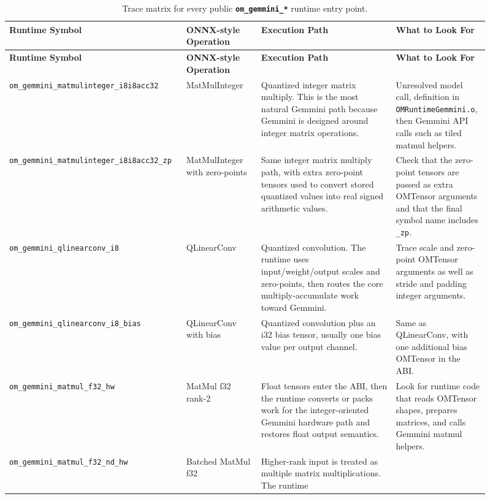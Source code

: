 \documentclass[12pt,a4paper]{article}
\newcommand{\file}[1]{\textcolor{fileteal}{\texttt{#1}}}
\newcommand{\cmd}[1]{\textcolor{argblue}{\texttt{\textbf{#1}}}}
\begin{document}
\renewcommand{\arraystretch}{1.18}
\scriptsize
\begin{longtable}{@{}p{0.32\linewidth}p{0.15\linewidth}p{0.27\linewidth}p{0.17\linewidth}@{}}
\caption{Trace matrix for every public \cmd{om\_gemmini\_*} runtime entry point.}\\
\toprule
\textbf{Runtime Symbol} & \textbf{ONNX-style Operation} & \textbf{Execution Path} & \textbf{What to Look For} \\
\midrule
\endfirsthead
\toprule
\textbf{Runtime Symbol} & \textbf{ONNX-style Operation} & \textbf{Execution Path} & \textbf{What to Look For} \\
\midrule
\endhead
\bottomrule
\endfoot
\texttt{om\_gemmini\_matmulinteger\_i8i8acc32} &
MatMulInteger &
Quantized integer matrix multiply. This is the most natural Gemmini path because
Gemmini is designed around integer matrix operations. &
Unresolved model call, definition in \file{OMRuntimeGemmini.o}, then Gemmini API
calls such as tiled matmul helpers. \\
\midrule
\texttt{om\_gemmini\_matmulinteger\_i8i8acc32\_zp} &
MatMulInteger with zero-points &
Same integer matrix multiply path, with extra zero-point tensors used to convert
stored quantized values into real signed arithmetic values. &
Check that the zero-point tensors are passed as extra OMTensor arguments and that
the final symbol name includes \texttt{\_zp}. \\
\midrule
\texttt{om\_gemmini\_qlinearconv\_i8} &
QLinearConv &
Quantized convolution. The runtime uses input/weight/output scales and
zero-points, then routes the core multiply-accumulate work toward Gemmini. &
Trace scale and zero-point OMTensor arguments as well as stride and padding
integer arguments. \\
\midrule
\texttt{om\_gemmini\_qlinearconv\_i8\_bias} &
QLinearConv with bias &
Quantized convolution plus an i32 bias tensor, usually one bias value per output
channel. &
Same as QLinearConv, with one additional bias OMTensor in the ABI. \\
\midrule
\texttt{om\_gemmini\_matmul\_f32\_hw} &
MatMul f32 rank-2 &
Float tensors enter the ABI, then the runtime converts or packs work for the
integer-oriented Gemmini hardware path and restores float output semantics. &
Look for runtime code that reads OMTensor shapes, prepares matrices, and calls
Gemmini matmul helpers. \\
\midrule
\texttt{om\_gemmini\_matmul\_f32\_nd\_hw} &
Batched MatMul f32 &
Higher-rank input is treated as multiple matrix multiplications. The runtime

\end{longtable}
\end{document}
